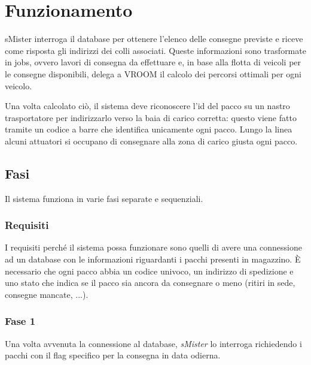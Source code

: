 \documentclass[12pt]{article}
\begin{document}
\section{Funzionamento}
sMister interroga il database per ottenere l'elenco delle consegne previste e riceve come risposta gli indirizzi dei colli associati. Queste informazioni sono trasformate in jobs, ovvero lavori di consegna da effettuare e, in base alla flotta di veicoli per le consegne disponibili, delega a VROOM il calcolo dei percorsi ottimali per ogni veicolo. 

Una volta calcolato ciò, il sistema deve riconoscere l'id del pacco su un nastro trasportatore per indirizzarlo verso la baia di carico corretta: questo viene fatto tramite un codice a barre che identifica unicamente ogni pacco. Lungo la linea alcuni attuatori si occupano di consegnare alla zona di carico giusta ogni pacco.

\subsection{Fasi}
Il sistema funziona in varie fasi separate e sequenziali.

\subsubsection{Requisiti}

I requisiti perché il sistema possa funzionare sono quelli di avere una connessione ad un database con le informazioni riguardanti i pacchi presenti in magazzino. È necessario che ogni pacco abbia un codice univoco, un indirizzo di spedizione e uno stato che indica se il pacco sia ancora da consegnare o meno (ritiri in sede, consegne mancate, ...). 

\subsubsection{Fase 1}

Una volta avvenuta la connessione al database, \emph{sMister} lo interroga richiedendo i pacchi con il flag specifico per la consegna in data odierna. 
\end{document}
